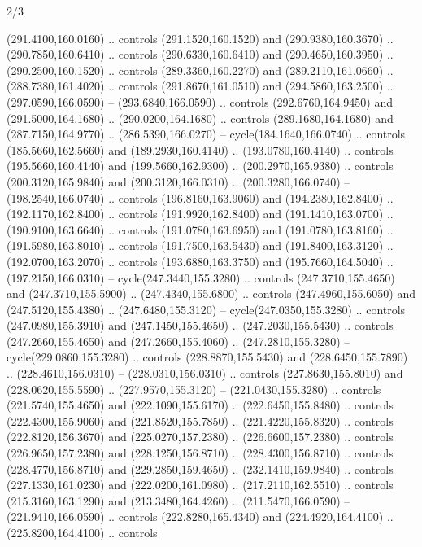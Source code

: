 \begin{flagdescription}{2/3}
\begin{scope}[xshift=0.5\flaglength,yshift=0.5\flagwidth,scale=\flagwidth/259.2]
\begin{scope}[y=0.8pt, x=0.8pt, yscale=-1,shift={(-243,-162)}]
      (291.4100,160.0160) .. controls (291.1520,160.1520) and (290.9380,160.3670) ..
      (290.7850,160.6410) .. controls (290.6330,160.6410) and (290.4650,160.3950) ..
      (290.2500,160.1520) .. controls (289.3360,160.2270) and (289.2110,161.0660) ..
      (288.7380,161.4020) .. controls (291.8670,161.0510) and (294.5860,163.2500) ..
      (297.0590,166.0590) -- (293.6840,166.0590) .. controls (292.6760,164.9450) and
      (291.5000,164.1680) .. (290.0200,164.1680) .. controls (289.1680,164.1680) and
      (287.7150,164.9770) .. (286.5390,166.0270) -- cycle(184.1640,166.0740) ..
      controls (185.5660,162.5660) and (189.2930,160.4140) .. (193.0780,160.4140) ..
      controls (195.5660,160.4140) and (199.5660,162.9300) .. (200.2970,165.9380) ..
      controls (200.3120,165.9840) and (200.3120,166.0310) .. (200.3280,166.0740) --
      (198.2540,166.0740) .. controls (196.8160,163.9060) and (194.2380,162.8400) ..
      (192.1170,162.8400) .. controls (191.9920,162.8400) and (191.1410,163.0700) ..
      (190.9100,163.6640) .. controls (191.0780,163.6950) and (191.0780,163.8160) ..
      (191.5980,163.8010) .. controls (191.7500,163.5430) and (191.8400,163.3120) ..
      (192.0700,163.2070) .. controls (193.6880,163.3750) and (195.7660,164.5040) ..
      (197.2150,166.0310) -- cycle(247.3440,155.3280) .. controls
      (247.3710,155.4650) and (247.3710,155.5900) .. (247.4340,155.6800) .. controls
      (247.4960,155.6050) and (247.5120,155.4380) .. (247.6480,155.3120) --
      cycle(247.0350,155.3280) .. controls (247.0980,155.3910) and
      (247.1450,155.4650) .. (247.2030,155.5430) .. controls (247.2660,155.4650) and
      (247.2660,155.4060) .. (247.2810,155.3280) -- cycle(229.0860,155.3280) ..
      controls (228.8870,155.5430) and (228.6450,155.7890) .. (228.4610,156.0310) --
      (228.0310,156.0310) .. controls (227.8630,155.8010) and (228.0620,155.5590) ..
      (227.9570,155.3120) -- (221.0430,155.3280) .. controls (221.5740,155.4650) and
      (222.1090,155.6170) .. (222.6450,155.8480) .. controls (222.4300,155.9060) and
      (221.8520,155.7850) .. (221.4220,155.8320) .. controls (222.8120,156.3670) and
      (225.0270,157.2380) .. (226.6600,157.2380) .. controls (226.9650,157.2380) and
      (228.1250,156.8710) .. (228.4300,156.8710) .. controls (228.4770,156.8710) and
      (229.2850,159.4650) .. (232.1410,159.9840) .. controls (227.1330,161.0230) and
      (222.0200,161.0980) .. (217.2110,162.5510) .. controls (215.3160,163.1290) and
      (213.3480,164.4260) .. (211.5470,166.0590) -- (221.9410,166.0590) .. controls
      (222.8280,165.4340) and (224.4920,164.4100) .. (225.8200,164.4100) .. controls

\end{scope}
\end{scope}
\end{flagdescription}
